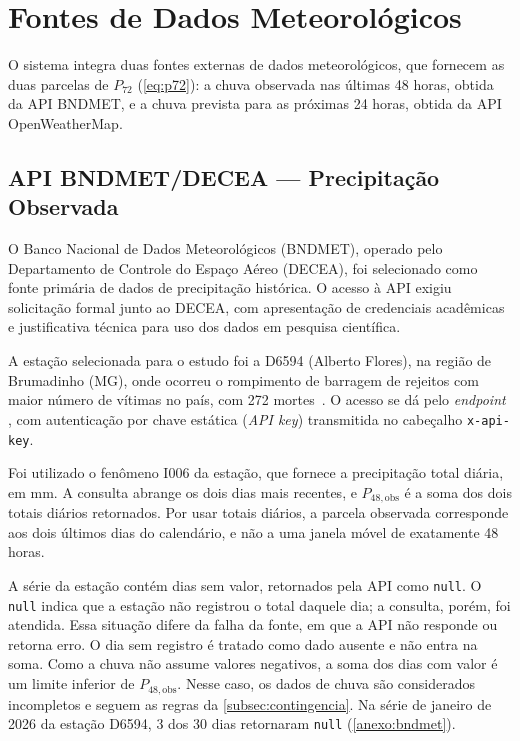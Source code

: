 \section{Fontes de Dados Meteorológicos}
\label{sec:fontes-dados}

O sistema integra duas fontes externas de dados meteorológicos, que
fornecem as duas parcelas de $P_{72}$ (\autoref{eq:p72}): a chuva
observada nas últimas 48 horas, obtida da API BNDMET, e a chuva prevista
para as próximas 24 horas, obtida da API OpenWeatherMap.

\subsection{API BNDMET/DECEA — Precipitação Observada}
\label{subsec:bndmet}

O Banco Nacional de Dados Meteorológicos (BNDMET),
operado pelo Departamento de Controle do Espaço Aéreo (DECEA), foi
selecionado como fonte primária de dados de precipitação histórica.
O acesso à API exigiu solicitação formal junto ao DECEA, com
apresentação de credenciais acadêmicas e justificativa técnica para
uso dos dados em pesquisa científica.

A estação selecionada para o estudo foi a D6594 (Alberto Flores), na
região de Brumadinho (MG), onde ocorreu o rompimento de barragem de
rejeitos com maior número de vítimas no país, com 272 mortes~\cite{minasgerais2024historico}. O acesso se dá pelo
\textit{endpoint} ,
com autenticação por chave estática (\textit{API key}) transmitida
no cabeçalho \texttt{x-api-key}.

Foi utilizado o fenômeno I006 da estação, que fornece a precipitação total
diária, em mm. A consulta abrange os dois dias mais recentes, e
$P_{48,\mathrm{obs}}$ é a soma dos dois totais diários retornados.
Por usar totais diários, a parcela observada corresponde aos dois últimos
dias do calendário, e não a uma janela móvel de exatamente 48 horas.

A série da estação contém dias sem valor, retornados pela API como
\texttt{null}. O \texttt{null} indica que a estação não registrou o total
daquele dia; a consulta, porém, foi atendida. Essa situação difere da
falha da fonte, em que a API não responde ou retorna erro.
O dia sem registro é tratado como dado ausente e não entra na soma.
Como a chuva não assume valores negativos, a soma dos dias com valor é
um limite inferior de $P_{48,\mathrm{obs}}$. Nesse caso, os dados de
chuva são considerados incompletos e seguem as regras da
\autoref{subsec:contingencia}.
Na série de janeiro de 2026 da estação D6594, 3 dos 30 dias
retornaram \texttt{null} (\autoref{anexo:bndmet}).

